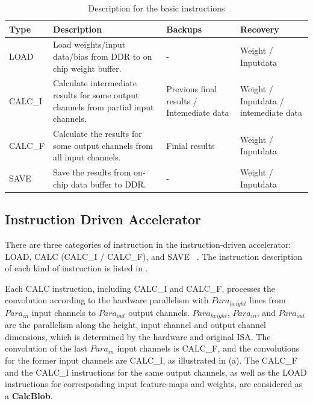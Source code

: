 \label{sec:cnninterrupt}


\begin{table}[t]
	\centering
	\scriptsize
	\caption{Description for the basic instructions}
\begin{tabular}{|p{4em}|p{12em}||p{6em}|p{6em}|}
	\hline
	Type  & Description & Backups & Recovery \bigstrut\\
	\hline
	LOAD  & Load weights/input data/bias from DDR to on chip weight buffer. & -     & Weight / Inputdata \bigstrut\\
	\hline
	CALC\_I & Calculate intermediate results for some output channels from partial  input channels. & Previous final results / Intemediate data  & Weight / Inputdata /  intemediate data \bigstrut\\
	\hline
	CALC\_F & Calculate the results for some output channels from all input channels. & Finial results & Weight / Inputdata \bigstrut\\
	\hline
	SAVE  & Save the results from on-chip data buffer to DDR. & -     & Weight / Inputdata \bigstrut\\
	\hline
	\end{tabular}%
	
	\label{tab:instr}%
  \end{table}%
  




\subsection{ Instruction Driven Accelerator }
\label{sec:instrAcc}
There are three categories of instruction in the instruction-driven accelerator: LOAD, CALC (CALC\_I / CALC\_F), and SAVE  ~\cite{guo2017angel,qiu2016going,yu2018instruction}. The instruction description of each kind of instruction is listed in . 

Each CALC  instruction,  including CALC\_I and CALC\_F, processes the convolution according to the hardware parallelism with $Para_{height}$ lines from $ Para_{in} $ input channels to $ Para_{out}$ output channels. $Para_{height}$, $ Para_{in} $, and $ Para_{out} $ are the parallelism along the height, input channel and output channel dimensions, which is determined by the hardware and original ISA. The convolution of the last $ Para_{in} $ input channels is CALC\_F, and the convolutions for the former input channels are CALC\_I, as illustrated in (a). The CALC\_F and the CALC\_I instructions for the same output channels, as well as the LOAD instructions for corresponding input feature-maps and weights, are considered as a \textbf{CalcBlob}.


